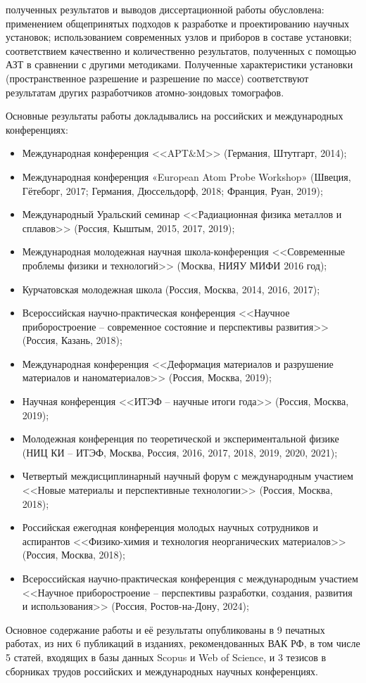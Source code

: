 {\reliability} полученных результатов и выводов диссертационной работы обусловлена: применением общепринятых подходов к разработке и проектированию научных установок; использованием современных узлов и приборов в составе установки; соответствием качественно и количественно результатов, полученных с помощью АЗТ в сравнении с другими методиками. Полученные характеристики установки (пространственное разрешение и разрешение по массе) соответствуют результатам других разработчиков атомно-зондовых томографов.


{\probation}
Основные результаты работы докладывались на российских и международных конференциях:
\begin{itemize}
	\item Международная конференция <<APT$\&$M>> (Германия, Штутгарт, 2014);
	\item Международная конференция «European Atom Probe Workshop» (Швеция, Гётеборг, 2017; Германия, Дюссельдорф, 2018; Франция, Руан, 2019);
	\item Международный Уральский семинар <<Радиационная физика металлов и сплавов>> (Россия, Кыштым, 2015, 2017, 2019);
	\item Международная молодежная научная школа-конференция <<Современные проблемы физики и технологий>> (Москва, НИЯУ МИФИ 2016 год);
	\item Курчатовская молодежная школа (Россия, Москва, 2014, 2016, 2017);
	\item Всероссийская научно-практическая конференция <<Научное приборостроение – современное состояние и перспективы развития>> (Россия, Казань, 2018);	
	\item Международная конференция <<Деформация материалов и разрушение материалов и наноматериалов>> (Россия, Москва, 2019); 
	\item Научная конференция <<ИТЭФ – научные итоги года>> (Россия, Москва, 2019);
	\item Молодежная конференция по теоретической и экспериментальной физике (НИЦ КИ – ИТЭФ, Москва, Россия, 2016, 2017, 2018, 2019, 2020, 2021);
	\item Четвертый междисциплинарный научный форум с международным участием <<Новые материалы и перспективные технологии>> (Россия, Москва, 2018);
	\item Российская ежегодная конференция молодых научных сотрудников и аспирантов <<Физико-химия и технология неорганических материалов>> (Россия, Москва, 2018);
	\item Всероссийская научно-практическая конференция с международным участием <<Научное приборостроение – перспективы разработки, создания, развития и использования>> (Россия, Ростов-на-Дону, 2024);
	
\end{itemize}
Основное содержание работы и её результаты опубликованы в 9 печатных работах, из них 6 публикаций в изданиях, рекомендованных ВАК РФ, в том числе 5 статей, входящих в базы данных Scopus и Web of Science, и 3 тезисов в сборниках трудов российских и международных научных конференциях.

